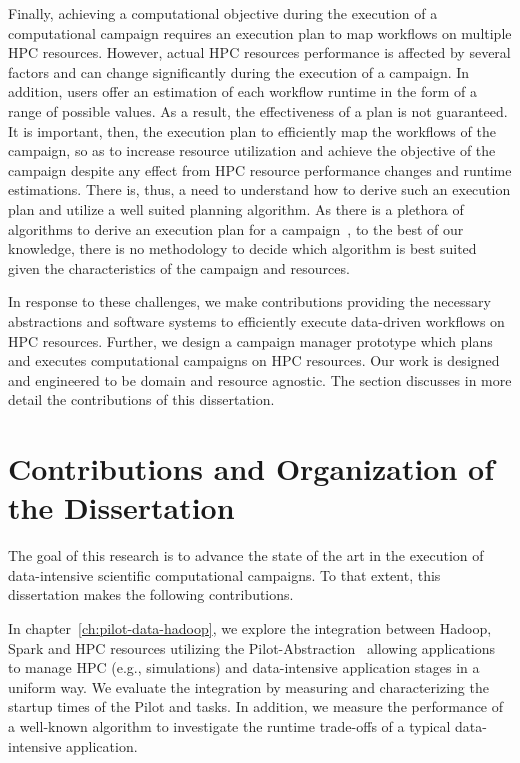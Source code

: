 Finally, achieving a computational objective during the execution of a
computational campaign requires an execution plan to map workflows on multiple
HPC resources. However, actual HPC resources performance is affected by several
factors and can change significantly during the execution of a campaign. In
addition, users offer an estimation of each workflow runtime in the form of a
range of possible values. As a result, the effectiveness of a plan is not
guaranteed. It is important, then, the execution plan to efficiently map the
workflows of the campaign, so as to increase resource utilization and achieve
the objective of the campaign despite any effect from HPC resource performance
changes and runtime estimations. There is, thus, a need to understand how to
derive such an execution plan and utilize a well suited planning algorithm. As
there is a plethora of algorithms to derive an execution plan for a
campaign~\cite{lu2019review}, to the best of our knowledge, there is no
methodology to decide which algorithm is best suited given the characteristics
of the campaign and resources.

In response to these challenges, we make contributions providing the necessary
abstractions and software systems to efficiently execute data-driven workflows
on HPC resources. Further, we design a campaign manager prototype which plans
and executes computational campaigns on HPC resources. Our work is designed and
engineered to be domain and resource agnostic. The section discusses in more
detail the contributions of this dissertation.

\section{Contributions and Organization of the Dissertation}

The goal of this research is to advance the state of the art in the execution
of data-intensive scientific computational campaigns. To that extent, this
dissertation makes the following contributions.

In chapter~\ref{ch:pilot-data-hadoop}, we explore the integration between
Hadoop, Spark and HPC resources utilizing the
Pilot-Abstraction~\cite{luckow2012pstar} allowing applications to manage HPC
(e.g., simulations) and data-intensive application stages in a uniform way. We
evaluate the integration by measuring and characterizing the startup times of
the Pilot and tasks. In addition, we measure the performance of a well-known
algorithm to investigate the runtime trade-offs of a typical data-intensive
application.

